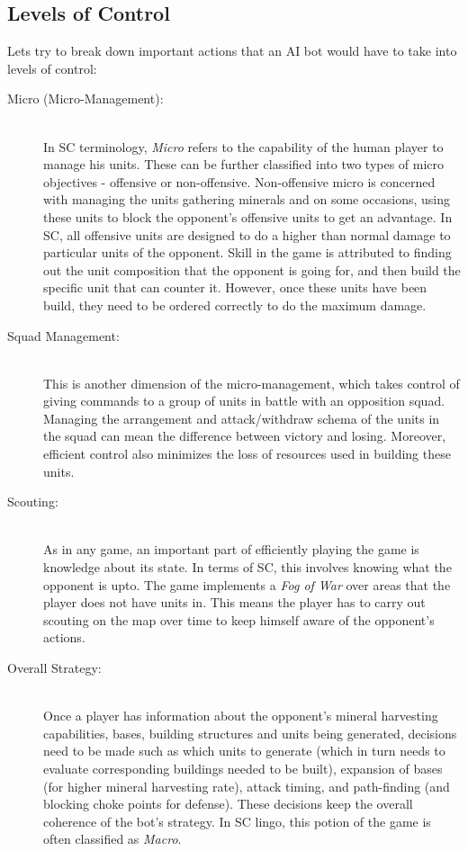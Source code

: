 \documentclass[conference]{IEEEtran}
\begin{document}
\subsection{Levels of Control}
Lets try to break down important actions that an AI bot would have to take into levels of control:
\begin{description}
  	\item[Micro (Micro-Management):] \hfill \\ 
In SC terminology, \emph{Micro} refers to the capability of the human player to manage his units. These can be further classified into two types of micro objectives - offensive or non-offensive. Non-offensive micro is concerned with managing the units gathering minerals and on some occasions, using these units to block the opponent's offensive units to get an advantage. In SC, all offensive units are designed to do a higher than normal damage to particular units of the opponent. Skill in the game is attributed to finding out the unit composition that the opponent is going for, and then build the specific unit that can counter it. However, once these units have been build, they need to be ordered correctly to do the maximum damage.
  	\item[Squad Management:] \hfill \\
This is another dimension of the micro-management, which takes control of giving commands to a group of units in battle with an opposition squad. Managing the arrangement and attack/withdraw schema of the units in the squad can mean the difference between victory and losing. Moreover, efficient control also minimizes the loss of resources used in building these units.
  	\item[Scouting:] \hfill \\
As in any game, an important part of efficiently playing the game is knowledge about its state. In terms of SC, this involves knowing what the opponent is upto. The game implements a \emph{Fog of War} over areas that the player does not have units in. This means the player has to carry out scouting on the map over time to keep himself aware of the opponent's actions.
	\item[Overall Strategy:] \hfill \\
Once a player has information about the opponent's mineral harvesting capabilities, bases, building structures and units being generated, decisions need to be made such as which units to generate (which in turn needs to evaluate corresponding buildings needed to be built), expansion of bases (for higher mineral harvesting rate), attack timing, and path-finding (and blocking choke points for defense). These decisions keep the overall coherence of the bot's strategy. In SC lingo, this potion of the game is often classified as \emph{Macro}.
\end{description}
\end{document}
